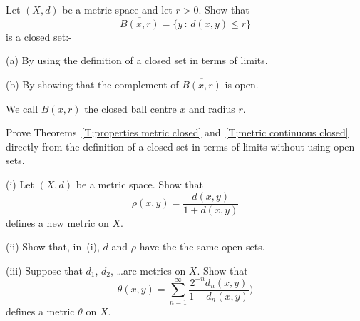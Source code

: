 \begin{problem} Let $(X,d)$ be a metric space
and let $r>0$.
Show that
\[\overline{B(x,r)}=\{y\,:\,d(x,y)\leq r\}\]
is a closed set:-

(a) By using the definition of a closed set in terms of limits.

(b) By showing that the complement of $\overline{B(x,r)}$
is open.

We call $\overline{B(x,r)}$ the closed ball centre $x$ and radius
$r$.
\end{problem}
\begin{problem} Prove Theorems~\ref{T;properties metric closed}
and~\ref{T;metric continuous closed}
directly from
the definition of a closed set in terms of limits
without using open sets.
\end{problem}
\begin{problem}\label{E;new metrics}
(i) Let $(X,d)$ be a metric space. Show that
\[\rho(x,y)=\frac{d(x,y)}{1+d(x,y)}\]
defines a new metric on $X$.

(ii) Show that, in~(i), $d$ and $\rho$ have the
the same open sets.

(iii) Suppose that $d_{1}$, $d_{2}$, \dots are metrics
on $X$. Show that
\[\theta(x,y)=\sum_{n=1}^{\infty}
\frac{2^{-n}d_{n}(x,y)}{1+d_{n}(x,y)})\]
defines a metric $\theta$ on $X$.
\end{problem}

